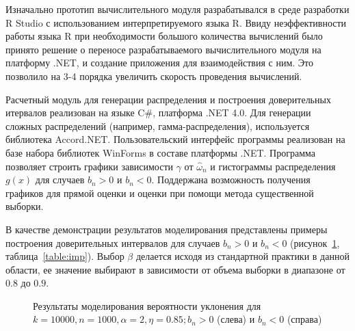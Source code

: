\documentclass[12pt, specialist, subf, substylefile = spbu.rtx]{disser}
\begin{document}
Изначально прототип вычислительного модуля разрабатывался в среде разработки R Studio с использованием интерпретируемого языка R. Ввиду неэффективности работы языка R при необходимости большого количества вычислений было принято решение о переносе разрабатываемого вычислительного модуля на платформу .NET, и создание приложения для взаимодействия с ним. Это позволило на 3-4 порядка увеличить скорость проведения вычислений.

Расчетный модуль для генерации распределения и построения доверительных итервалов реализован на языке C\#, платформа .NET 4.0. Для генерации сложных распределений (например, гамма-распределения), используется библиотека Accord.NET. Пользовательский интерфейс программы реализован на базе набора библиотек WinForms в составе платформы .NET. Программа позволяет строить графики зависимости $\gamma$ от $\hat{\omega}_n$ и гистограммы распределения $g(x)$ для случаев $b_n > 0 $ и $b_n < 0$. Поддержана возможность получения графиков для прямой оценки и оценки при помощи метода существенной выборки.

В качестве демонстрации результатов моделирования представлены примеры построения доверительных интервалов для случаев $b_n > 0$ и $b_n < 0$ (рисунок~\ref{ris:imp}, таблица~\ref{table:imp}). Выбор $\beta$ делается исходя из стандартной практики в данной области, ее значение выбирают в зависимости от объема выборки в диапазоне от $0.8$ до $0.9$.

\begin{figure}[h]
\caption{Результаты моделирования вероятности уклонения для $k=10000, n=1000, \alpha=2, \eta=0.85; b_n > 0 $ (слева) и $b_n < 0$ (справа)}
\label{ris:imp}
\end{figure}
\end{document}
